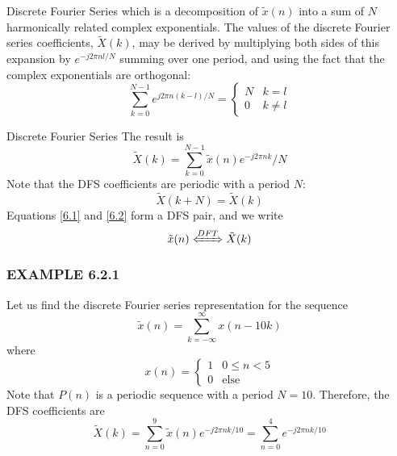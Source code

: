 \documentclass[pdflatex,compress,mathserif]{beamer}
\begin{document}
\begin{frame}{Discrete Fourier Series}
	which is a decomposition of $ \tilde{x}(n) $ into a sum of $ N $ harmonically related complex exponentials. The values of the discrete Fourier series coefficients, $ \tilde{X}(k) $, may be derived by multiplying both sides of this expansion by $ e^{-j2\pi nl/N} $ summing over one period, and using the fact that the complex exponentials are orthogonal:
	\begin{equation*}
		\sum\limits_{k=0}^{N-1} e^{j2 \pi n (k-l)/N} =
		\begin{cases}
			N & k = l \\
			0 & k \neq l
		\end{cases}
	\end{equation*}
\end{frame}

\begin{frame}{Discrete Fourier Series}
	The result is
	\begin{equation}\label{6.2}
		\tilde{X}(k) = \sum\limits_{k=0}^{N-1} \tilde{x}(n)e^{-j2 \pi n k} / N
	\end{equation}
	Note that the DFS coefficients are periodic with a period $ N $:
	\begin{equation*}
		\tilde{X}(k+N) = \tilde{X}(k)
	\end{equation*}
	Equations \ref{6.1} and \ref{6.2} form a DFS pair, and we write
	\begin{equation*}
		\tilde{x}(n) \xLeftrightarrow{DFT} \tilde{X}(k)
	\end{equation*}
\end{frame}

\begin{frame}
	\frametitle{EXAMPLE 6.2.1}
	Let us find the discrete Fourier series representation for the sequence
	\begin{equation*}
		\tilde{x}(n) = \sum\limits_{k=-\infty}^{\infty} x(n-10k)
	\end{equation*}
	where
	\begin{equation*}
		x(n) =
		\begin{cases}
			1 & 0 \leq n < 5 \\
			0 & \text{else}
		\end{cases}
	\end{equation*}
	Note that $ P(n) $ is a periodic sequence with a period $ N = 10 $. Therefore, the DFS coefficients are
	\begin{equation*}
		\tilde{X}(k) = \sum\limits_{n = 0}^9 \tilde{x}(n) e^{-j2 \pi nk / 10} = \sum\limits_{n = 0}^4 e^{-j2 \pi nk / 10}
	\end{equation*}
\end{frame}
\end{document}
